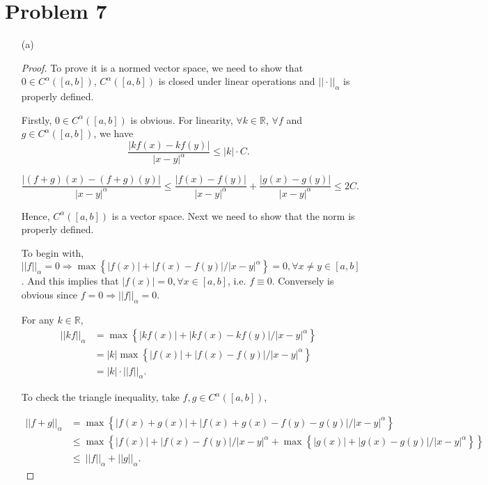 \documentclass[12pt]{article}
\begin{document}
\section*{Problem 7}

\begin{enumerate}
\item [(a)]

\begin{proof}

To prove it is a normed vector space, we need to show that $0 \in C^{\alpha} ([a, b])$, $C^{\alpha} ([a, b])$ is closed under linear operations and $||\cdot||_\alpha$ is properly defined.

Firstly, $0\in C^\alpha([a, b])$ is obvious. For linearity, $\forall k\in \mathbb R$, $\forall f$ and $g\in C^\alpha([a, b])$,  we have 
$$
\frac{|kf(x) - kf(y)|}{|x-y|^\alpha} \leqslant |k|\cdot C.
$$

$$
\frac{|(f+g)(x) - (f+g)(y)|}{|x-y|^\alpha} \leqslant \frac{|f(x)-f(y)|}{|x-y|^\alpha} + \frac{|g(x)-g(y)|}{|x-y|^\alpha} \leqslant  2C.
$$

Hence, $C^{\alpha} ([a, b])$ is a vector space. Next we need to show that the norm is properly defined.

To begin with, $||f||_\alpha =0 \Rightarrow \max\left\{ |f(x)| + |f(x) - f(y)|/|x-y|^\alpha \right\} = 0, \forall x\neq y \in [a, b]$. And this implies that $|f(x)| = 0, \forall x\in[a, b]$, i.e. $f \equiv 0$. Conversely is obvious since $f = 0 \Rightarrow ||f||_\alpha = 0 $.

For any $k \in \mathbb R$, 
$$
\begin{aligned}
||kf||_\alpha & = \max\left\{ |kf(x)| + |kf(x) - kf(y)|/|x-y|^\alpha \right\}\\
 & = |k|\max\left\{ |f(x)| + |f(x) - f(y)|/|x-y|^\alpha \right\} \\
& = |k|\cdot ||f||_\alpha.
\end{aligned}
$$ 

To check the triangle inequality, take $f, g\in C^\alpha([a, b])$, 

$$
\begin{aligned}
||f+g||_\alpha & = \max\left\{ |f(x) + g(x)| + |f(x) + g(x) - f(y) - g(y)|/|x-y|^\alpha \right\} \\
& \leqslant \max\left\{ |f(x)| + |f(x) - f(y)|/|x-y|^\alpha + \max\left\{ |g(x)| + |g(x) - g(y)|/|x-y|^\alpha \right\}  \right\} \\
& \leqslant \ ||f||_\alpha + ||g||_\alpha.
\end{aligned}
$$


\end{proof}
\end{enumerate}
\end{document}
